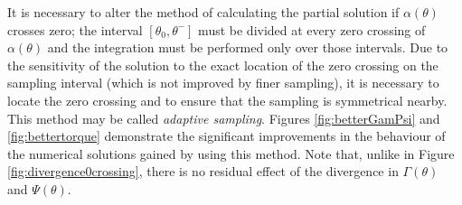 
It is necessary to alter the method of calculating the partial solution if $\alpha(\theta)$ crosses zero; the interval $[\theta_0, \theta^-]$ must be divided at every zero crossing of $\alpha(\theta)$ and the integration must be performed only over those intervals. Due to the sensitivity of the solution to the exact location of the zero crossing on the sampling interval (which is not improved by finer sampling), it is necessary to locate the zero crossing and to ensure that the sampling is symmetrical nearby. This method may be called \textit{adaptive sampling}. Figures \ref{fig:betterGamPsi} and \ref{fig:bettertorque} demonstrate the significant improvements in the behaviour of the numerical solutions gained by using this method. Note that, unlike in Figure \ref{fig:divergence0crossing}, there is no residual effect of the divergence in $\Gamma(\theta)$ and $\Psi(\theta)$.

